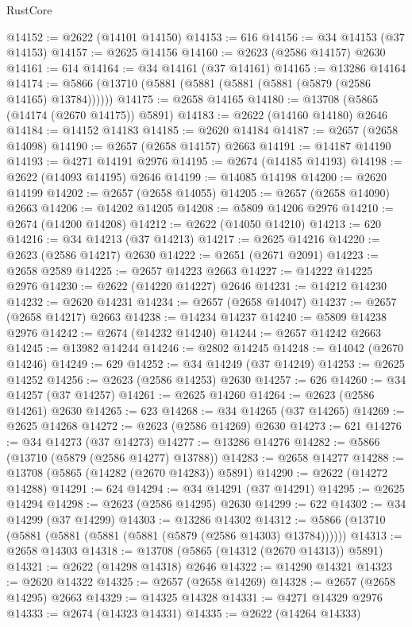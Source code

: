 \begin{lexlean}{RustCore}
\begin{coremodule}
@14152 := @2622 (@14101 @14150)
@14153 := 616
@14156 := @34 @14153 (@37 @14153)
@14157 := @2625 @14156
@14160 := @2623 (@2586 @14157) @2630
@14161 := 614
@14164 := @34 @14161 (@37 @14161)
@14165 := @13286 @14164
@14174 := @5866 (@13710 (@5881 (@5881 (@5881 (@5881 (@5879 (@2586 @14165) @13784))))))
@14175 := @2658 @14165
@14180 := @13708 (@5865 (@14174 (@2670 @14175)) @5891)
@14183 := @2622 (@14160 @14180) @2646
@14184 := @14152 @14183
@14185 := @2620 @14184
@14187 := @2657 (@2658 @14098)
@14190 := @2657 (@2658 @14157) @2663
@14191 := @14187 @14190
@14193 := @4271 @14191 @2976
@14195 := @2674 (@14185 @14193)
@14198 := @2622 (@14093 @14195) @2646
@14199 := @14085 @14198
@14200 := @2620 @14199
@14202 := @2657 (@2658 @14055)
@14205 := @2657 (@2658 @14090) @2663
@14206 := @14202 @14205
@14208 := @5809 @14206 @2976
@14210 := @2674 (@14200 @14208)
@14212 := @2622 (@14050 @14210)
@14213 := 620
@14216 := @34 @14213 (@37 @14213)
@14217 := @2625 @14216
@14220 := @2623 (@2586 @14217) @2630
@14222 := @2651 (@2671 @2091)
@14223 := @2658 @2589
@14225 := @2657 @14223 @2663
@14227 := @14222 @14225 @2976
@14230 := @2622 (@14220 @14227) @2646
@14231 := @14212 @14230
@14232 := @2620 @14231
@14234 := @2657 (@2658 @14047)
@14237 := @2657 (@2658 @14217) @2663
@14238 := @14234 @14237
@14240 := @5809 @14238 @2976
@14242 := @2674 (@14232 @14240)
@14244 := @2657 @14242 @2663
@14245 := @13982 @14244
@14246 := @2802 @14245
@14248 := @14042 (@2670 @14246)
@14249 := 629
@14252 := @34 @14249 (@37 @14249)
@14253 := @2625 @14252
@14256 := @2623 (@2586 @14253) @2630
@14257 := 626
@14260 := @34 @14257 (@37 @14257)
@14261 := @2625 @14260
@14264 := @2623 (@2586 @14261) @2630
@14265 := 623
@14268 := @34 @14265 (@37 @14265)
@14269 := @2625 @14268
@14272 := @2623 (@2586 @14269) @2630
@14273 := 621
@14276 := @34 @14273 (@37 @14273)
@14277 := @13286 @14276
@14282 := @5866 (@13710 (@5879 (@2586 @14277) @13788))
@14283 := @2658 @14277
@14288 := @13708 (@5865 (@14282 (@2670 @14283)) @5891)
@14290 := @2622 (@14272 @14288)
@14291 := 624
@14294 := @34 @14291 (@37 @14291)
@14295 := @2625 @14294
@14298 := @2623 (@2586 @14295) @2630
@14299 := 622
@14302 := @34 @14299 (@37 @14299)
@14303 := @13286 @14302
@14312 := @5866 (@13710 (@5881 (@5881 (@5881 (@5881 (@5879 (@2586 @14303) @13784))))))
@14313 := @2658 @14303
@14318 := @13708 (@5865 (@14312 (@2670 @14313)) @5891)
@14321 := @2622 (@14298 @14318) @2646
@14322 := @14290 @14321
@14323 := @2620 @14322
@14325 := @2657 (@2658 @14269)
@14328 := @2657 (@2658 @14295) @2663
@14329 := @14325 @14328
@14331 := @4271 @14329 @2976
@14333 := @2674 (@14323 @14331)
@14335 := @2622 (@14264 @14333)

\end{coremodule}
\end{lexlean}

